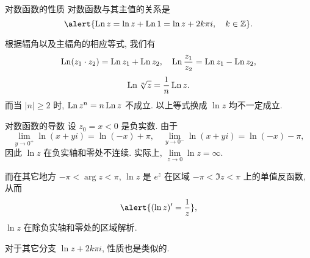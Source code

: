\begin{frame}{对数函数的性质}
\onslide<+->
对数函数与其主值的关系是
\[\alert{\Ln z=\ln z+\Ln 1=\ln z+2k\pi i,\quad k\in\BZ}.\]

\onslide<+->
根据辐角以及主辐角的相应等式, 我们有
\[\operatorname{Ln}(z_1\cdot z_2)=\operatorname{Ln} z_1+\operatorname{Ln} z_2,\quad
\operatorname{Ln}\frac{z_1}{z_2}=\operatorname{Ln} z_1-\operatorname{Ln} z_2,\]
\[\operatorname{Ln} \sqrt[n]z=\dfrac1n\operatorname{Ln} z.\]
\onslide<+->
而当 $|n|\ge 2$ 时, \alert{$\operatorname{Ln} z^n=n\operatorname{Ln} z$ 不成立}.
\onslide<+->
以上等式换成 $\ln z$ 均不一定成立.
\end{frame}


\begin{frame}{对数函数的导数}
\onslide<+->
设 $z_0=x<0$ 是负实数.
\onslide<+->
由于
\[\lim_{y\to0^+}\ln (x+yi)=\ln(-x)+\pi,\quad
\lim_{y\to0^-}\ln (x+yi)=\ln(-x)-\pi,\]
\onslide<+->
因此 $\ln z$ 在负实轴和零处不连续.
\onslide<+->
实际上, $\lim\limits_{z\to 0}\ln z=\infty$.

\onslide<+->
而在其它地方 $-\pi<\arg z<\pi$, $\ln z$ 是 $e^z$ 在区域 $-\pi<\Im z<\pi$ 上的单值反函数, 
\onslide<+->
从而
\[\alert{(\ln z)'=\frac 1z},\]
\alert{$\ln z$ 在除负实轴和零处的区域解析}.

\onslide<+->
对于其它分支 $\ln z+2k\pi i$, 性质也是类似的.
\end{frame}


